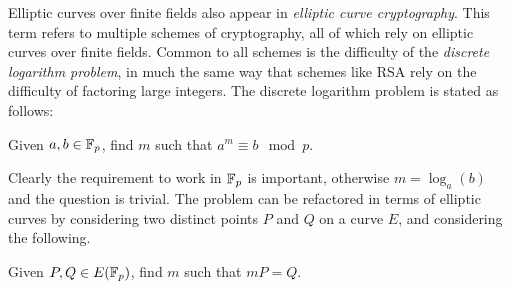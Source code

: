 Elliptic curves over finite fields also appear in \emph{elliptic curve cryptography}.
This term refers to multiple schemes of cryptography, all of which rely on elliptic curves over finite fields.
Common to all schemes is the difficulty of the \emph{discrete logarithm problem}, in much the same way that schemes like RSA rely on the difficulty of factoring large integers.
The discrete logarithm problem is stated as follows:

Given $a,b \in \mathbb{F}_{p}$, find $m$ such that $a^m \equiv b \mod p$.

Clearly the requirement to work in $\mathbb{F}_{p}$ is important, otherwise $m = \log_a(b)$ and the question is trivial.
The problem can be refactored in terms of elliptic curves by considering two distinct points $P$ and $Q$ on a curve $E$, and considering the following.

Given $P,Q \in E(\mathbb{F}_{p})$, find $m$ such that $mP = Q$.
